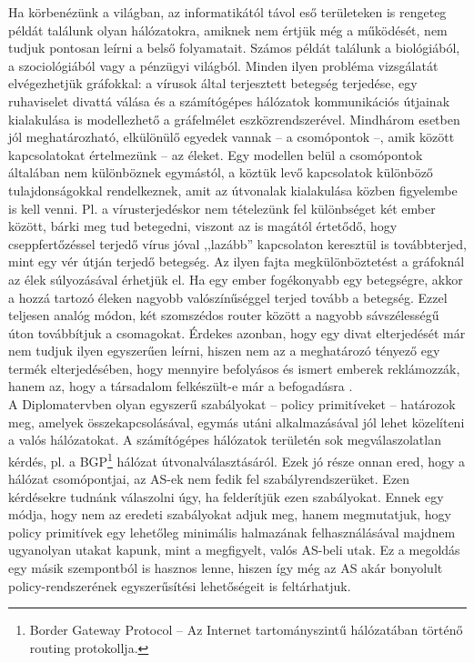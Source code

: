 Ha körbenézünk a világban, az informatikától távol eső területeken is rengeteg példát találunk olyan hálózatokra, amiknek nem értjük még a működését, nem tudjuk pontosan leírni a belső folyamatait. Számos példát találunk a biológiából, a szociológiából vagy a pénzügyi világból. Minden ilyen probléma vizsgálatát elvégezhetjük gráfokkal: a vírusok által terjesztett betegség terjedése, egy ruhaviselet divattá válása és a számítógépes hálózatok kommunikációs útjainak kialakulása is modellezhető a gráfelmélet eszközrendszerével. Mindhárom esetben jól meghatározható, elkülönülő egyedek vannak -- a csomópontok --, amik között kapcsolatokat értelmezünk -- az éleket. Egy modellen belül a csomópontok általában nem különböznek egymástól, a köztük levő kapcsolatok különböző tulajdonságokkal rendelkeznek, amit az útvonalak kialakulása közben figyelembe is kell venni. Pl. a vírusterjedéskor nem tételezünk fel különbséget két ember között, bárki meg tud betegedni, viszont az is magától értetődő, hogy cseppfertőzéssel terjedő vírus jóval ,,lazább'' kapcsolaton keresztül is továbbterjed, mint egy vér útján terjedő betegség. Az ilyen fajta megkülönböztetést a gráfoknál az élek súlyozásával érhetjük el. Ha egy ember fogékonyabb egy betegségre, akkor a hozzá tartozó éleken nagyobb valószínűséggel terjed tovább a betegség. Ezzel teljesen analóg módon, két szomszédos router között a nagyobb sávszélességű úton továbbítjuk a csomagokat. Érdekes azonban, hogy egy divat elterjedését már nem tudjuk ilyen egyszerűen leírni, hiszen nem az a meghatározó tényező egy termék elterjedésében, hogy mennyire befolyásos és ismert emberek reklámozzák, hanem az, hogy a társadalom felkészült-e már a befogadásra \cite{DuncanWatts, DobreiMScOnlab1}.\\

A Diplomatervben olyan egyszerű szabályokat -- policy primitíveket -- határozok meg, amelyek összekapcsolásával, egymás utáni alkalmazásával jól lehet közelíteni a valós hálózatokat. A számítógépes hálózatok területén sok megválaszolatlan kérdés, pl. a BGP\footnote{Border Gateway Protocol -- Az Internet tartományszintű hálózatában történő routing protokollja.} hálózat útvonalválasztásáról. Ezek jó része onnan ered, hogy a hálózat csomópontjai, az AS-ek nem fedik fel szabályrendszerüket. Ezen kérdésekre tudnánk válaszolni úgy, ha felderítjük ezen szabályokat. Ennek egy módja, hogy nem az eredeti szabályokat adjuk meg, hanem megmutatjuk, hogy policy primitívek egy lehetőleg minimális halmazának felhasználásával majdnem ugyanolyan utakat kapunk, mint a megfigyelt, valós AS-beli utak. Ez a megoldás egy másik szempontból is hasznos lenne, hiszen így még az AS akár bonyolult policy-rendszerének egyszerűsítési lehetőségeit is feltárhatjuk.\\

